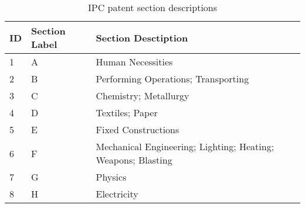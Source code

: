 \begin{table}[h]
\centering
\begin{tabular}{@{}lll@{}}
\toprule
ID & Section Label & Section Desctiption                                          \\ \midrule
1  & A             & Human Necessities                                            \\
2  & B             & Performing Operations; Transporting                          \\
3  & C             & Chemistry; Metallurgy                                        \\
4  & D             & Textiles; Paper                                              \\
5  & E             & Fixed Constructions                                          \\
6  & F             & Mechanical Engineering; Lighting; Heating; Weapons; Blasting \\
7  & G             & Physics                                                      \\
8  & H             & Electricity                                                  \\ \bottomrule
\end{tabular}
\caption{IPC patent section descriptions}
\label{tab:ipc_sections}
\end{table}
